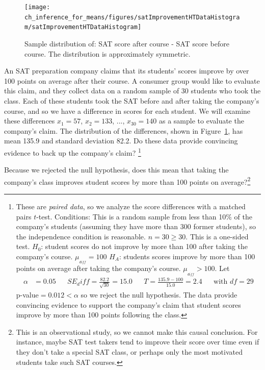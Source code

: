 \begin{figure}[h]
\centering
\texttt{[image: ch\_inference\_for\_means/figures/satImprovementHTDataHistogram/satImprovementHTDataHistogram]}
\caption{Sample distribution of:  SAT score after course - SAT score before course. The distribution is approximately symmetric.}
\label{satImprovementHTDataHistogram}
\end{figure}

\textA{\newpage}

\begin{exercise}An SAT preparation company claims that its students' scores improve by over 100 points on average after their course. A consumer group would like to evaluate this claim, and they collect data on a random sample of 30 students who took the class. Each of these students took the SAT before and after taking the company's course, and so we have a difference in scores for each student. We will examine these differences $x_1=57$, $x_2=133$, ..., $x_{30}=140$ as a sample to evaluate the company's claim. The distribution of the differences, shown in Figure~\ref{satImprovementHTDataHistogram}, has mean 135.9 and standard deviation 82.2. Do these data provide convincing evidence to back up the company's claim?
\footnote{These are \emph{paired data}, so we analyze the score differences with a matched pairs $t$-test. Conditions: This is a random sample from less than 10\% of the company's students (assuming they have more than 300 former students), so the independence condition is reasonable. $n=30\ge 30$.
This is a one-sided test. $H_0$: student scores do not improve by more than 100 after taking the company's course. $\mu_{_{diff}} = 100$  $H_A$: students scores improve by more than 100 points on average after taking the company's course. $\mu_{_{diff}} > 100$.
Let
\begin{align*}
\alpha&=0.05
&&SE_diff = \frac{82.2}{\sqrt{30}} = 15.0
&&T = \frac{135.9-100}{15.0}=2.4
&&\text{with }df=29
\end{align*}
p-value$=0.012<\alpha$ so we reject the null hypothesis. The data provide convincing evidence to support the company's claim that student scores improve by more than 100 points following the class.}
\end{exercise}

\begin{exercise}
Because we rejected the null hypothesis, does this mean that taking the company's class improves student scores by more than 100 points on average?\footnote{This is an observational study, so we cannot make this causal conclusion. For instance, maybe SAT test takers tend to improve their score over time even if they don't take a special SAT class, or perhaps only the most motivated students take such SAT courses.}


\end{exercise}



